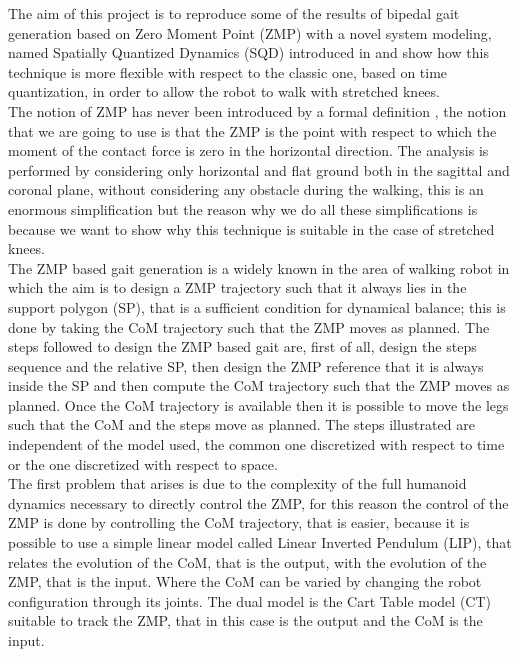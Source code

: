 \documentclass[a4paper]{article}
\begin{document}
The aim of this project is to reproduce some of the results of bipedal gait generation based on Zero Moment Point (ZMP) with a novel system modeling, named Spatially Quantized Dynamics (SQD) introduced in \cite{Kaj1} and show how this technique is more flexible with respect to the classic one, based on time quantization, in order to allow the robot to walk with stretched knees.\\
The notion of ZMP has never been introduced by a formal definition \cite{Vukobratovic}, the notion that we are going to use is that the ZMP is the point with respect to which the moment of the contact force is zero in the horizontal direction.
The analysis is performed by considering only horizontal and flat ground both in the sagittal and coronal plane, without considering any obstacle during the walking, this is an enormous simplification but the reason why we do all these simplifications is because we want to show why this technique is suitable in the case of stretched knees.\\
The ZMP based gait generation is a widely known in the area of walking robot in which the aim is to design a ZMP trajectory such that it always lies in the support polygon (SP), that is a sufficient condition for dynamical balance; this is done by taking the CoM trajectory such that the ZMP moves as planned. The steps followed to design the ZMP based gait are, first of all, design the steps sequence and the relative SP, then design the ZMP reference that it is always inside the SP and then compute the CoM trajectory such that the  ZMP moves as planned. Once the CoM trajectory is available then it is possible to move the legs such that the CoM and the steps move as planned. The steps illustrated are independent of the model used, the common one discretized with respect to time or the one discretized with respect to space.\\
The first problem that arises is due to the complexity of the full humanoid dynamics necessary to  directly control the ZMP, for this reason the control of the ZMP is done by controlling the CoM trajectory, that is easier, because it is possible to use a simple linear model called Linear Inverted Pendulum (LIP), that relates the evolution of the CoM, that is the output, with the evolution of the ZMP, that is the input. Where the CoM can be varied by changing the robot configuration through its joints. The dual model is the Cart Table model (CT) suitable to track the ZMP, that in this case is the output and the CoM is the input.\\
\end{document}
